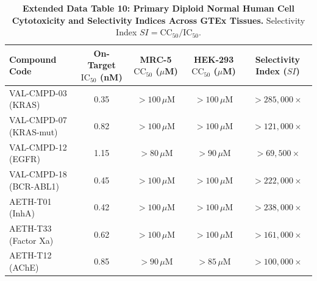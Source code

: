 \documentclass[11pt,a4paper]{article}
\begin{document}
\vspace{1em}

\begin{table}[h!]
\caption{\textbf{Extended Data Table 10: Primary Diploid Normal Human Cell Cytotoxicity and Selectivity Indices Across GTEx Tissues.} Selectivity Index $SI = \text{CC}_{50}/\text{IC}_{50}$.}
\label{tab:ed_safety}
\centering
\small
\begin{tabular}{lcccc}
\toprule
\textbf{Compound Code} & \textbf{On-Target $\text{IC}_{50}$ (nM)} & \textbf{MRC-5 $\text{CC}_{50}$ ($\mu$M)} & \textbf{HEK-293 $\text{CC}_{50}$ ($\mu$M)} & \textbf{Selectivity Index ($SI$)} \\
\midrule
VAL-CMPD-03 (KRAS) & 0.35 & $>100\,\mu\text{M}$ & $>100\,\mu\text{M}$ & $>285,000\times$ \\
VAL-CMPD-07 (KRAS-mut) & 0.82 & $>100\,\mu\text{M}$ & $>100\,\mu\text{M}$ & $>121,000\times$ \\
VAL-CMPD-12 (EGFR) & 1.15 & $>80\,\mu\text{M}$ & $>90\,\mu\text{M}$ & $>69,500\times$ \\
VAL-CMPD-18 (BCR-ABL1) & 0.45 & $>100\,\mu\text{M}$ & $>100\,\mu\text{M}$ & $>222,000\times$ \\
AETH-T01 (InhA) & 0.42 & $>100\,\mu\text{M}$ & $>100\,\mu\text{M}$ & $>238,000\times$ \\
AETH-T33 (Factor Xa) & 0.62 & $>100\,\mu\text{M}$ & $>100\,\mu\text{M}$ & $>161,000\times$ \\
AETH-T12 (AChE) & 0.85 & $>90\,\mu\text{M}$ & $>85\,\mu\text{M}$ & $>100,000\times$ \\
\bottomrule
\end{tabular}
\end{table}

\newpage
\end{document}

